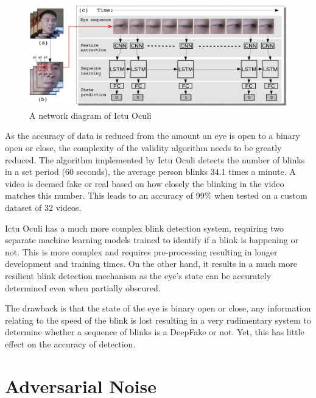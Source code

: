 \begin{figure}[H]
    \centering
    \includegraphics[width=0.75\linewidth]{dissertation//figures/ictu-oculi.png}
    \caption{A network diagram of Ictu Oculi\cite{li2018ictu}}
    \label{fig:ictu-oculi}
\end{figure}

As the accuracy of data is reduced from the amount an eye is open to a binary open or close, the complexity of the validity algorithm needs to be greatly reduced. The algorithm implemented by Ictu Oculi detects the number of blinks in a set period (60 seconds), the average person blinks 34.1 times a minute. A video is deemed fake or real based on how closely the blinking in the video matches this number. This leads to an accuracy of 99\% when tested on a custom dataset of 32 videos.

Ictu Oculi has a much more complex blink detection system, requiring two separate machine learning models trained to identify if a blink is happening or not. This is more complex and requires pre-processing resulting in longer development and training times. On the other hand, it results in a much more resilient blink detection mechanism as the eye's state can be accurately determined even when partially obscured.

The drawback is that the state of the eye is binary open or close, any information relating to the speed of the blink is lost resulting in a very rudimentary system to determine whether a sequence of blinks is a DeepFake or not. Yet, this has little effect on the accuracy of detection.

\section{Adversarial Noise}


